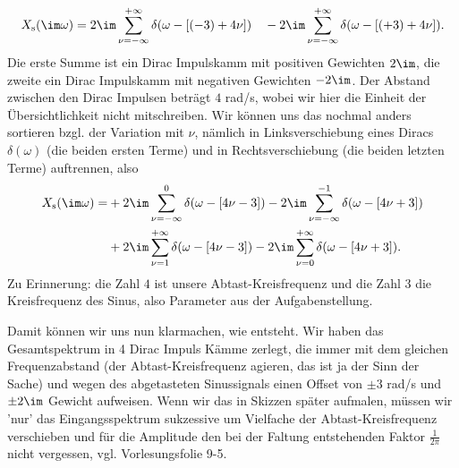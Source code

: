 \begin{ExCalc}
\begin{equation}
X_\mathrm{s}(\im\omega) = 2\im
\sum_{\nu=-\infty}^{+\infty} \delta(\omega - [(-3)+4\nu])
\quad-
2\im
\sum_{\nu=-\infty}^{+\infty} \delta(\omega - [(+3)+4\nu]).
\end{equation}
Die erste Summe ist ein Dirac Impulskamm mit positiven Gewichten $2\im$, die
zweite ein Dirac Impulskamm mit negativen Gewichten $-2\im$. Der Abstand zwischen
den Dirac Impulsen beträgt $4$ rad/s, wobei wir hier die Einheit der
Übersichtlichkeit nicht mitschreiben.
%
Wir können uns das nochmal anders sortieren bzgl. der Variation mit $\nu$,
nämlich in Linksverschiebung eines Diracs $\delta(\omega)$
(die beiden ersten Terme) und in Rechtsverschiebung
(die beiden letzten Terme) auftrennen, also
\begin{align}
X_\mathrm{s}(\im\omega) =
&+2\im\sum_{\nu=-\infty}^{0} \delta(\omega - [4\nu-3])
-2\im\sum_{\nu=-\infty}^{-1} \delta(\omega - [4\nu+3])\\
&+2\im\sum_{\nu=1}^{+\infty} \delta(\omega - [4\nu-3])
-2\im\sum_{\nu=0}^{+\infty} \delta(\omega - [4\nu+3]).
\end{align}
Zu Erinnerung: die Zahl $4$ ist unsere Abtast-Kreisfrequenz und die Zahl $3$
die Kreisfrequenz des Sinus, also Parameter aus der Aufgabenstellung.

Damit können wir uns nun klarmachen, wie
 entsteht. Wir haben das Gesamtspektrum
in 4 Dirac Impuls Kämme zerlegt, die immer mit dem gleichen Frequenzabstand
(der Abtast-Kreisfrequenz agieren, das ist ja der Sinn der Sache) und wegen
des abgetasteten Sinussignals einen Offset von $\pm 3$ rad/s und $\pm 2\im$ Gewicht
aufweisen.
Wenn wir das in Skizzen später aufmalen, müssen wir 'nur' das Eingangsspektrum
sukzessive um Vielfache der Abtast-Kreisfrequenz verschieben und für die Amplitude
den bei der Faltung entstehenden Faktor $\frac{1}{2\pi}$ nicht vergessen, vgl.
Vorlesungsfolie 9-5.
\end{ExCalc}
